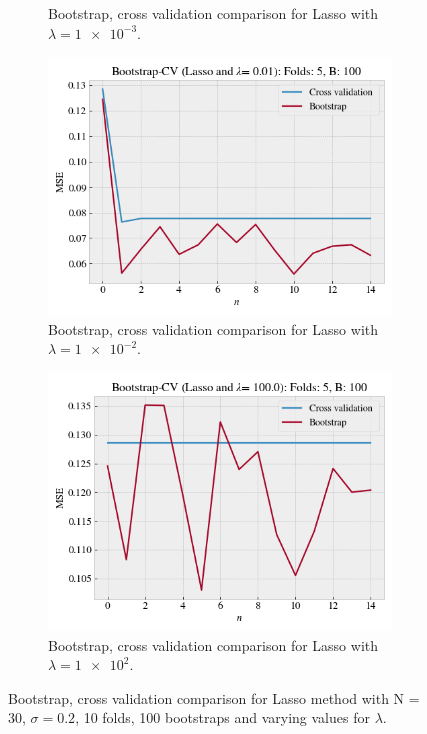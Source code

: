 \documentclass[norsk,a4paper,12pt]{scrartcl}
\begin{document}
\begin{figure}[H]
\begin{subfigure}[b]{0.49\textwidth}
        \caption{Bootstrap, cross validation comparison for Lasso with $\lambda = \num{1e-3}$.}
    \label{fig:CV_B_Lasso001}
     \end{subfigure}
    \begin{subfigure}[b]{0.49\textwidth}
         \centering
         \includegraphics[width=\textwidth]{figures/CV_B_Lasso_01.png}
          \caption{Bootstrap, cross validation comparison for Lasso with $\lambda = \num{1e-2}$.}
          \label{fig:CV_B_Lasso1}
     \end{subfigure}
     \hfill
     \begin{subfigure}[b]{0.49\textwidth}
         \centering
         \includegraphics[width=\textwidth]{figures/CV_B_Lasso_100.png}
         \caption{Bootstrap, cross validation comparison for Lasso with $\lambda = \num{1e2}$.   }
        \label{fig:fig:CV_B_Lasso1}
     \end{subfigure}
    \caption{Bootstrap, cross validation comparison for Lasso method with N = 30, $\sigma = 0.2$, 10 folds, 100 bootstraps and varying values for $\lambda$.}
    \label{fig:CV_B_Lasso}
\end{figure}
\end{document}

